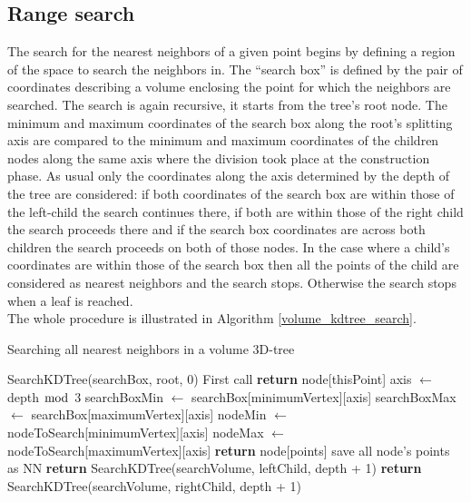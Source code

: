 \subsection{Range search}
The search for the nearest neighbors of a given point begins by defining a region of the space to search the neighbors in.
The ``search box'' is defined by the pair of coordinates describing a volume enclosing the point for which the neighbors are searched. The search is again recursive, it starts from the tree's root node. The minimum and maximum coordinates of the search box along the root's splitting axis are compared to the minimum and maximum coordinates of the children nodes along the same axis where the division took place at the construction phase. As usual only the coordinates along the axis determined by the depth of the tree are considered: if both coordinates of the search box are within those of the left-child  the search continues there, if both are within those of the right child the search proceeds there and if the search box coordinates are across both children the search proceeds on both of those nodes. In the case where a child's coordinates are within those of the search box then all the points of the child are considered as nearest neighbors and the search stops. Otherwise the search stops when a leaf is reached.\\
The whole procedure is illustrated in Algorithm \ref{volume_kdtree_search}.\\
\begin{algorithm}
\caption{Searching all nearest neighbors in a volume 3D-tree}
\label{volume_kdtree_search}
\begin{algorithmic}
\State SearchKDTree(searchBox, root, 0) \Comment First call
    \State \textbf{return} node[thisPoint]
  \EndIf
  \State axis $\gets$ depth $\bmod$ 3
  \State searchBoxMin $\gets$ searchBox[minimumVertex][axis]
  \State searchBoxMax $\gets$ searchBox[maximumVertex][axis]
  \State nodeMin $\gets$ nodeToSearch[minimumVertex][axis]
  \State nodeMax $\gets$ nodeToSearch[maximumVertex][axis]
  \State \textbf{return} node[points] \Comment save all node's points as NN
  \Else
  	  \State \textbf{return} SearchKDTree(searchVolume, leftChild, depth + 1)
  	\EndIf
 	  \State \textbf{return} SearchKDTree(searchVolume, rightChild, depth + 1)
	\EndIf
  \EndIf
\EndProcedure
\end{algorithmic}
\end{algorithm}


